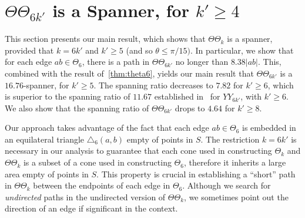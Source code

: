 \documentclass[runningheads,a4paper]{llncs}
\begin{document}
\section{$\Theta\Theta_{6k'}$ is a Spanner, for $k' \ge 4$}
\label{sec:main}
This section presents our main result, which shows that $\Theta\Theta_k$ is a spanner, provided that $k = 6k'$ and $k' \ge 5$ (and so $\theta \le \pi/15)$. In particular, we show that for each edge $ab \in \Theta_6$, there is a path in $\Theta\Theta_{6k'}$ no longer than $8.38|ab|$. This, combined with the result of~\autoref{thm:theta6}, yields our main result that $\Theta\Theta_{6k'}$ is a $16.76$-spanner, for $k' \ge 5$. The spanning ratio decreases to $7.82$ for $k' \ge 6$,  which is superior to the spanning ratio of $11.67$ established in~\cite{jDR12} for $YY_{6k'}$, with $k' \ge 6$. We also show that the spanning ratio of $\Theta\Theta_{6k'}$ drops to $4.64$ for $k' \ge 8$. 

Our approach takes advantage of the fact that each edge $ab \in \Theta_6$ is embedded in an equilateral triangle $\triangle_6(a, b)$ empty of points in $S$. The restriction $k = 6k'$ is necessary in our analysis to guarantee that each cone used in constructing $\Theta_k$ and $\Theta\Theta_k$ is a subset of a cone used in constructing $\Theta_6$, therefore it inherits a large area empty of 
points in $S$. This property is crucial in establishing a ``short'' path in $\Theta\Theta_{k}$ between the endpoints of each edge in $\Theta_6$. Although we search for \emph{undirected} paths in the undirected version of $\Theta\Theta_k$, we sometimes point out the direction of an edge if significant in the context. 
\end{document}
